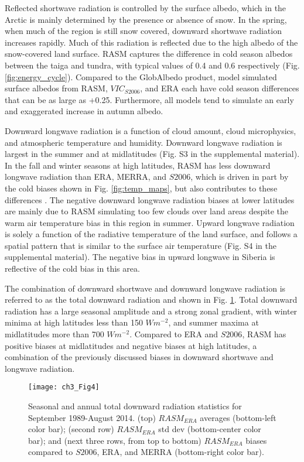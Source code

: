 Reflected shortwave radiation is controlled by the surface albedo, which in the Arctic is mainly determined by the presence or absence of snow.
In the spring, when much of the region is still snow covered, downward shortwave radiation increases rapidly.
Much of this radiation is reflected due to the high albedo of the snow-covered land surface.
RASM captures the difference in cold season albedos between the taiga and tundra, with typical values of 0.4 and 0.6 respectively (Fig. \ref{fig:energy_cycle}).
Compared to the GlobAlbedo product, model simulated surface albedos from RASM, $VIC_{S2006}$, and ERA each have cold season differences that can be as large as +0.25.
Furthermore, all models tend to simulate an early and exaggerated increase in autumn albedo.

Downward longwave radiation is a function of cloud amount, cloud microphysics, and atmospheric temperature and humidity.
Downward longwave radiation is largest in the summer and at midlatitudes (Fig. S3 in the supplemental material).
In the fall and winter seasons at high latitudes, RASM has less downward longwave radiation than ERA, MERRA, and $S2006$, which is driven in part by the cold biases shown in Fig. \ref{fig:temp_maps}, but also contributes to these differences \citep{Cassano_2016}.
The negative downward longwave radiation biases at lower latitudes are mainly due to RASM simulating too few clouds over land areas despite the warm air temperature bias in this region in summer.
Upward longwave radiation is solely a function of the radiative temperature of the land surface, and follows a spatial pattern that is similar to the surface air temperature (Fig. S4 in the supplemental material).
The negative bias in upward longwave in Siberia is reflective of the cold bias in this area.

The combination of downward shortwave and downward longwave radiation is referred to as the total downward radiation and shown in Fig. \ref{fig:drad_maps}.
Total downward radiation has a large seasonal amplitude and a strong zonal gradient, with winter minima at high latitudes less than 150 $W m^{-2}$, and summer maxima at midlatitudes more than 700 $W m^{-2}$.
Compared to ERA and $S2006$, RASM has positive biases at midlatitudes and negative biases at high latitudes, a combination of the previously discussed biases in downward shortwave and longwave radiation.

\begin{figure}
  \centering
  \texttt{[image: ch3\_Fig4]}
  \caption{Seasonal and annual total downward radiation statistics for September 1989-August 2014.
  (top) $RASM_{ERA}$ averages (bottom-left color bar); (second row) $RASM_{ERA}$ std dev (bottom-center color bar); and (next three rows, from top to bottom) $RASM_{ERA}$ biases compared to $S2006$, ERA, and MERRA (bottom-right color bar).}
  \label{fig:drad_maps}
\end{figure}


